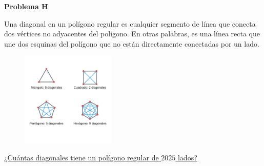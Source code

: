 \begin{center}
\Large \textbf{Problema H} \\
\end{center}

Una diagonal en un polígono regular es cualquier segmento de línea que conecta dos vértices no adyacentes del polígono.
En otras palabras, es una línea recta que une dos esquinas del polígono que no están directamente conectadas por un lado.

\begin{figure}[H]
    \centering
    \includegraphics[width=0.4\textwidth]{diagonales.png}
\end{figure}

\underline{¿Cuántas diagonales tiene un polígono regular de $2025$ lados?}


